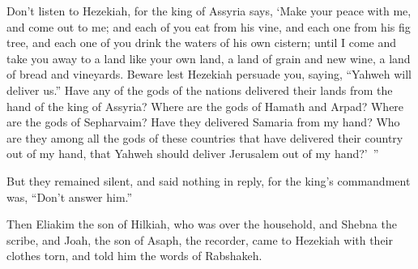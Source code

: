 {Don’t listen to Hezekiah, for the king of Assyria says, ‘Make your peace with me, and come out to me; and each of you eat from his vine, and each one from his fig tree, and each one of you drink the waters of his own cistern;
until I come and take you away to a land like your own land, a land of grain and new wine, a land of bread and vineyards.
Beware lest Hezekiah persuade you, saying, “Yahweh will deliver us.” Have any of the gods of the nations delivered their lands from the hand of the king of Assyria?
Where are the gods of Hamath and Arpad? Where are the gods of Sepharvaim? Have they delivered Samaria from my hand?
Who are they among all the gods of these countries that have delivered their country out of my hand, that Yahweh should deliver Jerusalem out of my hand?’ ”
\par }{\PP {}But they remained silent, and said nothing in reply, for the king’s commandment was, “Don’t answer him.”
\par }{\PP {}Then Eliakim the son of Hilkiah, who was over the household, and Shebna the scribe, and Joah, the son of Asaph, the recorder, came to Hezekiah with their clothes torn, and told him the words of Rabshakeh.

}
